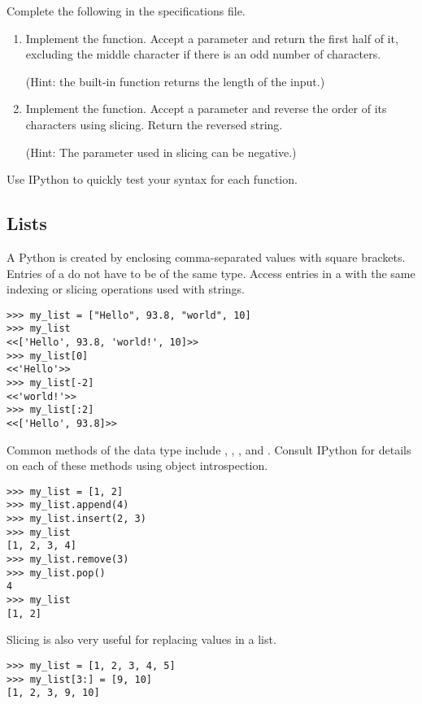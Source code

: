 \begin{problem}
Complete the following in the specifications file.
\begin{enumerate}
\item Implement the  function.
Accept a parameter  and return the first half of it, excluding the middle character if there is an odd number of characters.

(Hint: the built-in  function returns the length of the input.)
\item Implement the  function.
Accept a parameter  and reverse the order of its characters using slicing.
Return the reversed string.

(Hint: The  parameter used in slicing can be negative.)
\end{enumerate}
Use IPython to quickly test your syntax for each function.
\end{problem}


\subsection*{Lists}
A Python  is created by enclosing comma-separated values with square brackets.
Entries of a  do not have to be of the same type.
Access entries in a  with the same indexing or slicing operations used with strings.
\begin{lstlisting}
>>> my_list = ["Hello", 93.8, "world", 10]
>>> my_list
<<['Hello', 93.8, 'world!', 10]>>
>>> my_list[0]
<<'Hello'>>
>>> my_list[-2]
<<'world!'>>
>>> my_list[:2]
<<['Hello', 93.8]>>
\end{lstlisting}

Common methods of the  data type include , , , and .
Consult IPython for details on each of these methods using object introspection.
\begin{lstlisting}
>>> my_list = [1, 2]
>>> my_list.append(4)
>>> my_list.insert(2, 3)
>>> my_list
[1, 2, 3, 4]
>>> my_list.remove(3)
>>> my_list.pop()
4
>>> my_list
[1, 2]
\end{lstlisting}

Slicing is also very useful for replacing values in a list.
\begin{lstlisting}
>>> my_list = [1, 2, 3, 4, 5]
>>> my_list[3:] = [9, 10]
[1, 2, 3, 9, 10]
\end{lstlisting}

